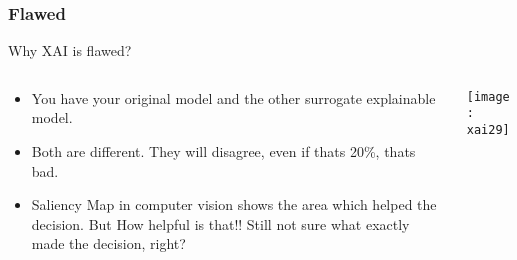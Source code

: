 \begin{frame}[fragile]\frametitle{Flawed}

Why XAI is flawed?

\begin{columns}
    \begin{column}[T]{0.6\linewidth}
		
			\begin{itemize}
			\item You have your original model and the other surrogate explainable model.
			\item Both are different. They will disagree, even if thats 20\%, thats bad.
			\item Saliency Map in computer vision shows the area which helped the decision. But How helpful is that!! Still not sure what exactly made the decision, right?
			\end{itemize}
			
    \end{column}
    \begin{column}[T]{0.4\linewidth}

      \begin{center}
      \texttt{[image: xai29]}
	  	\end{center}
    \end{column}
  \end{columns}

\end{frame}


